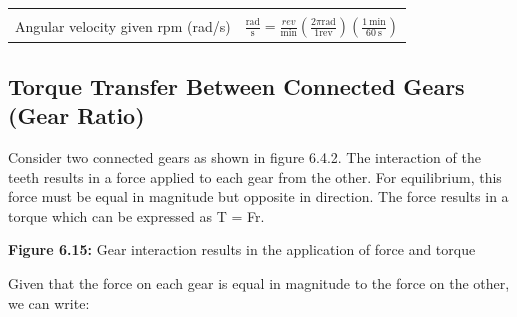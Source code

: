 \documentclass[
  letterpaper,
  DIV=11,
  numbers=noendperiod]{scrreprt}
\begin{document}
\begin{longtable}[]{@{}
  >{\raggedright\arraybackslash}p{}
  >{\raggedright\arraybackslash}p{}@{}}
                                                                                                                                                                                                                                                                                                                \) \\
Angular velocity given rpm (rad/s) &
\(                                                                                                                                                                                                                                                                                                                                                                                                                                                   
                                                                                                                                                                                                                                                                                                                \frac{\mathrm{rad}}{\mathrm{s}}=\frac{r e v}{\min }\left(\frac{2 \pi \mathrm{rad}}{1 \mathrm{rev}}\right)\left(\frac{1 \mathrm{~min}}{60 \mathrm{~s}}\right)                
                                                                                                                                                                                                                                                                                                                \) \\
\end{longtable}

\subsection{Torque Transfer Between Connected Gears (Gear
Ratio)}\label{torque-transfer-between-connected-gears-gear-ratio}

Consider two connected gears as shown in figure 6.4.2. The interaction
of the teeth results in a force applied to each gear from the other. For
equilibrium, this force must be equal in magnitude but opposite in
direction. The force results in a torque which can be expressed as T =
Fr.

\textbf{Figure 6.15:} Gear interaction results in the application of
force and torque

Given that the force on each gear is equal in magnitude to the force on
the other, we can write:
\end{document}
